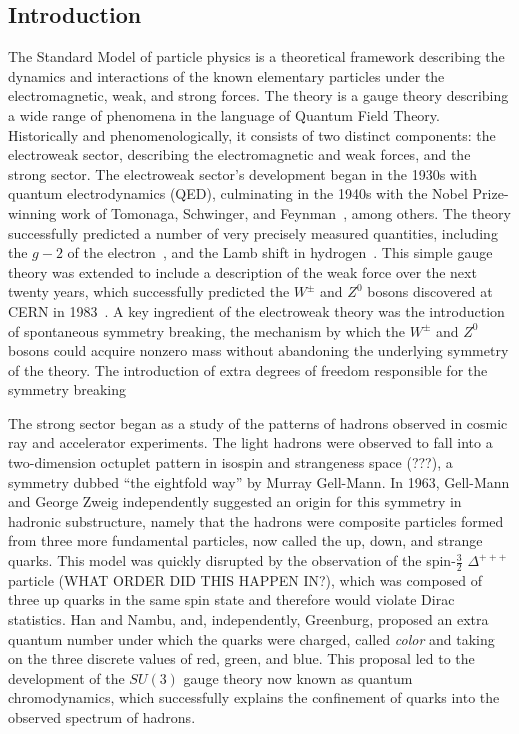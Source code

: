 \subsection{Introduction}
The Standard Model of particle physics is a theoretical framework describing the dynamics and interactions of the known elementary particles under the electromagnetic, weak, and strong forces. The theory is a gauge theory describing a wide range of phenomena in the language of Quantum Field Theory. Historically and phenomenologically, it consists of two distinct components: the electroweak sector, describing the electromagnetic and weak forces, and the strong sector. The electroweak sector's development began in the 1930s with quantum electrodynamics (QED), culminating in the 1940s with the Nobel Prize-winning work of Tomonaga, Schwinger, and Feynman~\cite{QED}, among others. The theory successfully predicted a number of very precisely measured quantities, including the $g-2$ of the electron~\cite{g-2}, and the Lamb shift in hydrogen~\cite{bethe-lamb}. This simple gauge theory was extended to include a description of the weak force over the next twenty years, which successfully predicted the $W^{\pm}$ and $Z^0$ bosons discovered at CERN in 1983~\cite{WZ-discovery}. A key ingredient of the electroweak theory was the introduction of spontaneous symmetry breaking, the mechanism by which the $W^{\pm}$ and $Z^0$ bosons could acquire nonzero mass without abandoning the underlying symmetry of the theory. The introduction of extra degrees of freedom responsible for the symmetry breaking 

The strong sector began as a study of the patterns of hadrons observed in cosmic ray and accelerator experiments. The light hadrons were observed to fall into a two-dimension octuplet pattern in isospin and strangeness space (???), a symmetry dubbed ``the eightfold way'' by Murray Gell-Mann. In 1963, Gell-Mann and George Zweig independently suggested an origin for this symmetry in hadronic substructure, namely that the hadrons were composite particles formed from three more fundamental particles, now called the up, down, and strange quarks. This model was quickly disrupted by the observation of the spin-$\frac32$ $\Delta^{+++}$ particle (WHAT ORDER DID THIS HAPPEN IN?), which was composed of three up quarks in the same spin state and therefore would violate Dirac statistics. Han and Nambu, and, independently, Greenburg, proposed an extra quantum number under which the quarks were charged, called \emph{color} and taking on the three discrete values of red, green, and blue. This proposal led to the development of the $SU(3)$ gauge theory now known as quantum chromodynamics, which successfully explains the confinement of quarks into the observed spectrum of hadrons. 

